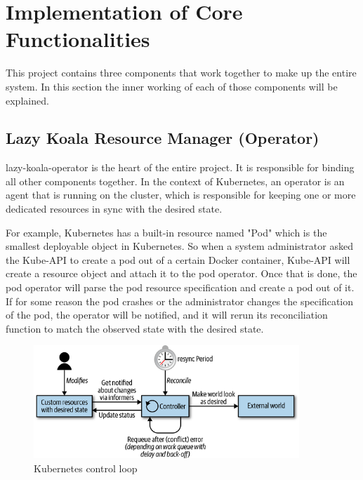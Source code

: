 \section{Implementation of Core Functionalities}

This project contains three components that work together to make up the entire system. In this section the inner working of each of those components will be explained.

\subsection{Lazy Koala Resource Manager (Operator)}

\ac{lazy-koala-operator} is the heart of the entire project. It is responsible for binding all other components together. In the context of Kubernetes, an operator is an agent that is running on the cluster, which is responsible for keeping one or more dedicated resources in sync with the desired state. 

For example, Kubernetes has a built-in resource named "Pod" which is the smallest deployable object in Kubernetes. So when a system administrator asked the Kube-API to create a pod out of a certain Docker container, Kube-API will create a resource object and attach it to the pod operator. Once that is done, the pod operator will parse the pod resource specification and create a pod out of it. If for some reason the pod crashes or the administrator changes the specification of the pod, the operator will be notified, and it will rerun its reconciliation function to match the observed state with the desired state.

\begin{figure}[H]
    \includegraphics[width=10cm]{assets/implementation/kubernetes-control-loop.png}
    \caption{Kubernetes control loop \citep{hausenblas2019programming}}
\end{figure}


